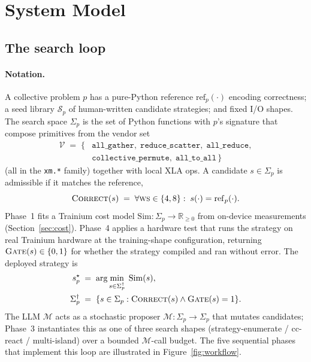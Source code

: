 \section{System Model}
\label{sec:model}

\subsection{The search loop}

\paragraph{Notation.} A collective problem $p$ has a pure-Python
reference $\mathrm{ref}_p(\cdot)$ encoding correctness; a seed
library $\mathcal{S}_p$ of human-written candidate strategies; and
fixed I/O shapes. The search space $\Sigma_p$ is the set of Python
functions with $p$'s signature that compose primitives from the
vendor set
\begin{equation*}
\begin{aligned}
\mathcal{V} \;=\; \{ &\texttt{all\_gather},\; \texttt{reduce\_scatter},\; \texttt{all\_reduce},\\
                     &\texttt{collective\_permute},\; \texttt{all\_to\_all} \,\}
\end{aligned}
\end{equation*}
(all in the \texttt{xm.*} family) together with local XLA ops. A candidate $s \in \Sigma_p$ is admissible if it
matches the reference,
\[
\textsc{Correct}(s) \;=\; \forall \textsc{ws} \in \{4, 8\}:
   \; s(\cdot) = \mathrm{ref}_p(\cdot).
\]
Phase~1 fits a Trainium cost model
$\mathrm{Sim}: \Sigma_p \to \mathbb{R}_{\ge 0}$ from on-device
measurements (Section~\ref{sec:cost}). Phase~4 applies a hardware test that runs the strategy on real
Trainium hardware at the training-shape configuration, returning
$\textsc{Gate}(s) \in \{0, 1\}$ for whether the strategy compiled
and ran without error.
The deployed strategy is
\begin{equation*}
\begin{aligned}
s^\star_p &\;=\; \arg\min_{s \in \Sigma_p^\dagger}\; \mathrm{Sim}(s), \\
\Sigma_p^\dagger &\;=\; \{s \in \Sigma_p : \textsc{Correct}(s) \wedge \textsc{Gate}(s)=1\}.
\end{aligned}
\end{equation*}
The LLM $\mathcal{M}$ acts as a stochastic proposer
$\mathcal{M}: \Sigma_p \to \Sigma_p$ that mutates candidates;
Phase~3 instantiates this as one of three search shapes
(strategy-enumerate / cc-react / multi-island) over a bounded
$\mathcal{M}$-call budget. The five sequential phases that
implement this loop are illustrated in
Figure~\ref{fig:workflow}.


